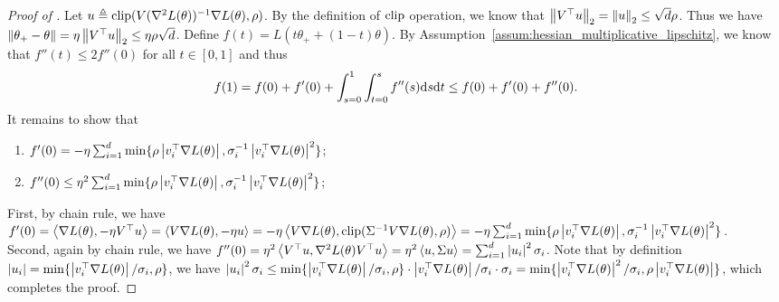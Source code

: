 \begin{proof}[Proof of ]
	Let $ u \triangleq \textup{clip}(V(\nabla^2L(\theta))^{-1}\nabla L(\theta),\rho)$. By the definition of $\textup{clip}$ operation, we know that $\left\|V^\top u\right\|_2 = \left\|u\right\|_2 \le \sqrt{d} \rho$. Thus  we have $\left\|\theta_+ - \theta\right\|  = \eta \left\|V^\top u\right\|_2 \le \eta\rho\sqrt{d}$. Define $f(t) = L(t\theta_+ + (1-t)\theta)$. By Assumption~\ref{assum:hessian_multiplicative_lipschitz}, we know that $f''(t)\le 2f''(0)$ for all $t\in[0,1]$ and thus 
	\begin{align}
	f(1) = f(0) + f'(0) + \int_{s=0}^1\int_{t=0}^s f''(s)\mathrm{d} s\mathrm{d} t	\le f(0)+f'(0)+f''(0).
	\end{align}
	It remains to show that 
	\begin{enumerate}
		\item $f'(0) = -\eta \sum_{i=1}^d \min\{ \rho \left| v_i^\top \nabla L(\theta) \right|, \sigma_i^{-1}\left| v_i^\top \nabla L(\theta) \right|^2\}$;
		\item $f''(0) \le  \eta^2 \sum_{i=1}^d \min\{ \rho \left| v_i^\top \nabla L(\theta) \right|, \sigma_i^{-1}\left| v_i^\top \nabla L(\theta) \right|^2\}$;
	\end{enumerate}
	First, by chain rule, we have $f'(0) = \left\langle \nabla L(\theta),-\eta V^\top u \right\rangle=\left\langle V\nabla L(\theta),-\eta u \right\rangle = -\eta \left\langle V\nabla L(\theta), \textup{clip}(\Sigma^{-1}V\nabla L(\theta),\rho) \right\rangle=-\eta \sum_{i=1}^d \min\{ \rho \left| v_i^\top \nabla L(\theta) \right|, \sigma_i^{-1}\left| v_i^\top \nabla L(\theta) \right|^2\}$.\\
	Second, again by chain rule, we have $f''(0) = \eta^2 \left\langle V^\top u,\nabla^2L(\theta) V^\top u \right\rangle = \eta^2 \left\langle u,\Sigma u \right\rangle = \sum_{i=1}^d \left| u_i \right|^2\sigma_i$. Note that by definition $\left| u_i \right|=\min\{\left| v_i^\top \nabla L(\theta) \right|/\sigma_i,\rho\}$, we have $\left| u_i \right|^2\sigma_i\le \min\{\left| v_i^\top \nabla L(\theta) \right|/\sigma_i,\rho\}\cdot \left| v_i^\top \nabla L(\theta) \right|/\sigma_i \cdot \sigma_i = \min\{\left| v_i^\top \nabla L(\theta) \right|^2/\sigma_i,\rho\left| v_i^\top \nabla L(\theta) \right|\}$, which completes the proof.
\end{proof}

